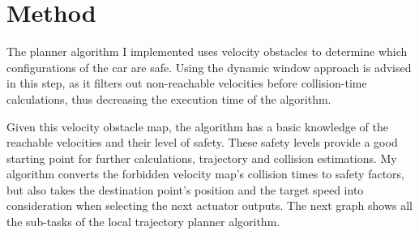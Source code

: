 \section{Method}
The planner algorithm I implemented uses velocity obstacles to determine which configurations of the car are safe.  Using the dynamic window approach is advised in this step, as it filters out non-reachable velocities before collision-time calculations, thus decreasing the execution time of the algorithm.

Given this velocity obstacle map, the algorithm has a basic knowledge of the reachable velocities and their level of safety. These safety levels provide a good starting point for further calculations, trajectory and collision estimations. My algorithm converts the forbidden velocity map's collision times to safety factors, but also takes the destination point's position and the target speed into consideration when selecting the next actuator outputs. The next graph shows all the sub-tasks of the local trajectory planner algorithm.


